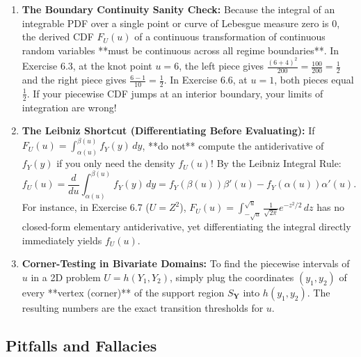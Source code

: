 \documentclass[11pt, letterpaper]{article}
\theoremstyle{definition}
\theoremstyle{remark}
\begin{document}
\begin{enumerate}
    \item \textbf{The Boundary Continuity Sanity Check:} Because the integral of an integrable PDF over a single point or curve of Lebesgue measure zero is $0$, the derived CDF $F_U(u)$ of a continuous transformation of continuous random variables **must be continuous across all regime boundaries**. In Exercise 6.3, at the knot point $u = 6$, the left piece gives $\frac{(6+4)^2}{200} = \frac{100}{200} = \frac{1}{2}$ and the right piece gives $\frac{6-1}{10} = \frac{1}{2}$. In Exercise 6.6, at $u = 1$, both pieces equal $\frac{1}{2}$. If your piecewise CDF jumps at an interior boundary, your limits of integration are wrong!
    \item \textbf{The Leibniz Shortcut (Differentiating Before Evaluating):} If $F_U(u) = \int_{\alpha(u)}^{\beta(u)} f_Y(y)\,dy$, **do not** compute the antiderivative of $f_Y(y)$ if you only need the density $f_U(u)$! By the Leibniz Integral Rule:
    \[
        f_U(u) = \frac{d}{du} \int_{\alpha(u)}^{\beta(u)} f_Y(y)\,dy = f_Y(\beta(u))\beta'(u) - f_Y(\alpha(u))\alpha'(u).
    \]
    For instance, in Exercise 6.7 ($U = Z^2$), $F_U(u) = \int_{-\sqrt{u}}^{\sqrt{u}} \frac{1}{\sqrt{2\pi}}e^{-z^2/2}\,dz$ has no closed-form elementary antiderivative, yet differentiating the integral directly immediately yields $f_U(u)$.
    \item \textbf{Corner-Testing in Bivariate Domains:} To find the piecewise intervals of $u$ in a 2D problem $U = h(Y_1, Y_2)$, simply plug the coordinates $(y_1, y_2)$ of every **vertex (corner)** of the support region $S_{\mathbf{Y}}$ into $h(y_1, y_2)$. The resulting numbers are the exact transition thresholds for $u$.
\end{enumerate}

\subsection{Pitfalls and Fallacies}
\end{document}
